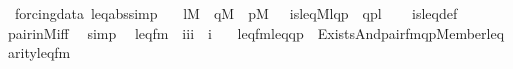 \begin{isabellebody}
\isanewline
{}\isamarkupfalse%
\ {\isacharparenleft}{\kern0pt}\ forcing{\isacharunderscore}{\kern0pt}data{\isacharparenright}{\kern0pt}\ leq{\isacharunderscore}{\kern0pt}abs{\isacharbrackleft}{\kern0pt}simp{\isacharbrackright}{\kern0pt}{\isacharcolon}{\kern0pt}\isanewline
\ \ {\isachardoublequoteopen}{\isasymlbrakk}\ l{\isasymin}M\ {\isacharsemicolon}{\kern0pt}\ q{\isasymin}M\ {\isacharsemicolon}{\kern0pt}\ p{\isasymin}M\ {\isasymrbrakk}\ {\isasymLongrightarrow}\ is{\isacharunderscore}{\kern0pt}leq{\isacharparenleft}{\kern0pt}{\isacharhash}{\kern0pt}{\isacharhash}{\kern0pt}M{\isacharcomma}{\kern0pt}l{\isacharcomma}{\kern0pt}q{\isacharcomma}{\kern0pt}p{\isacharparenright}{\kern0pt}\ {\isasymlongleftrightarrow}\ {\isasymlangle}q{\isacharcomma}{\kern0pt}p{\isasymrangle}{\isasymin}l{\isachardoublequoteclose}\isanewline
%
\isadelimproof
\ \ %
\endisadelimproof
%
\isatagproof
{}\isamarkupfalse%
\ is{\isacharunderscore}{\kern0pt}leq{\isacharunderscore}{\kern0pt}def\ \isamarkupfalse%
\ pair{\isacharunderscore}{\kern0pt}in{\isacharunderscore}{\kern0pt}M{\isacharunderscore}{\kern0pt}iff\ \isamarkupfalse%
\ simp%
\endisatagproof
{\isafoldproof}%
%
\isadelimproof
\isanewline
%
\endisadelimproof
\isanewline
\isanewline
{}\isamarkupfalse%
\isanewline
\ \ leq{\isacharunderscore}{\kern0pt}fm\ {\isacharcolon}{\kern0pt}{\isacharcolon}{\kern0pt}\ {\isachardoublequoteopen}{\isacharbrackleft}{\kern0pt}i{\isacharcomma}{\kern0pt}i{\isacharcomma}{\kern0pt}i{\isacharbrackright}{\kern0pt}\ {\isasymRightarrow}\ i{\isachardoublequoteclose}\ \isanewline
\ \ {\isachardoublequoteopen}leq{\isacharunderscore}{\kern0pt}fm{\isacharparenleft}{\kern0pt}leq{\isacharcomma}{\kern0pt}q{\isacharcomma}{\kern0pt}p{\isacharparenright}{\kern0pt}\ {\isasymequiv}\ Exists{\isacharparenleft}{\kern0pt}And{\isacharparenleft}{\kern0pt}pair{\isacharunderscore}{\kern0pt}fm{\isacharparenleft}{\kern0pt}q{\isacharhash}{\kern0pt}{\isacharplus}{\kern0pt}{}{\isacharcomma}{\kern0pt}p{\isacharhash}{\kern0pt}{\isacharplus}{\kern0pt}{}{\isacharcomma}{\kern0pt}{}{\isacharparenright}{\kern0pt}{\isacharcomma}{\kern0pt}Member{\isacharparenleft}{\kern0pt}{}{\isacharcomma}{\kern0pt}leq{\isacharhash}{\kern0pt}{\isacharplus}{\kern0pt}{}{\isacharparenright}{\kern0pt}{\isacharparenright}{\kern0pt}{\isacharparenright}{\kern0pt}{\isachardoublequoteclose}\isanewline
\isanewline
{}\isamarkupfalse%
\ arity{\isacharunderscore}{\kern0pt}leq{\isacharunderscore}{\kern0pt}fm\ {\isacharcolon}{\kern0pt}\isanewline

\end{isabellebody}
